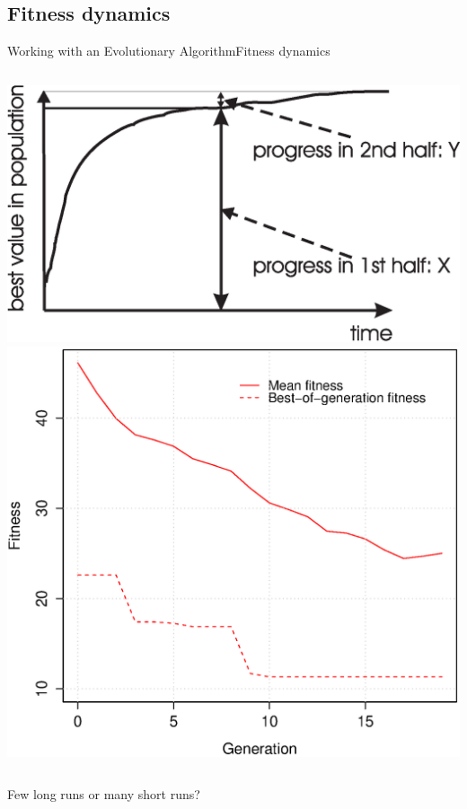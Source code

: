 \documentclass[10pt,compress]{beamer} %
\begin{document}
\subsection{Fitness dynamics}
\begin{frame}{Working with an Evolutionary Algorithm}{Fitness dynamics}
    \begin{columns}
		\includegraphics[width=\linewidth]{figs/fitness.eps}
		\includegraphics[width=\linewidth]{figs/fitness-k2.eps}
	\end{columns}
	Few long runs or many short runs?
\end{frame}
\end{document}
